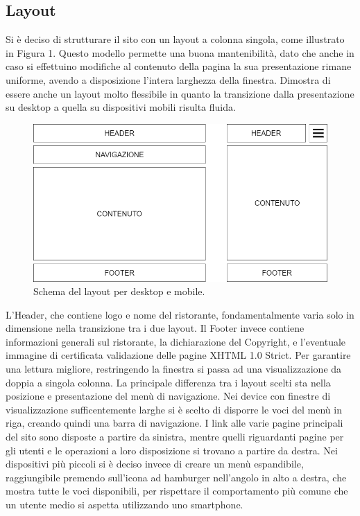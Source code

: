 \documentclass{article}
\begin{document}
		\subsection{Layout}
			Si è deciso di strutturare il sito con un layout a colonna singola, come illustrato in Figura 1. Questo modello permette una buona mantenibilità, dato che anche in caso si effettuino modifiche al contenuto della pagina la sua presentazione rimane uniforme, avendo a disposizione l'intera larghezza della finestra. 
		    Dimostra di essere anche un layout molto flessibile in quanto la transizione dalla presentazione su desktop a quella su dispositivi mobili risulta fluida.
		    \begin{figure}[http] %
		        \centering
		        \includegraphics[width=\textwidth]{schema_layout.png}
		        \caption{Schema del layout per desktop e mobile.}
		        \label{fig:layout}
		    \end{figure}
		    \bigbreak
		    L'Header, che contiene logo e nome del ristorante, fondamentalmente varia solo in dimensione nella transizione tra i due layout.
		    \bigbreak
		    Il Footer invece contiene informazioni generali sul ristorante, la dichiarazione del Copyright, e l'eventuale immagine di certificata validazione delle pagine XHTML 1.0 Strict. Per garantire una lettura migliore, restringendo la finestra si passa ad una visualizzazione da doppia a singola colonna.
		    \bigbreak
		    La principale differenza tra i layout scelti sta nella posizione e presentazione del menù di navigazione. 
		    \newline Nei device con finestre di visualizzazione sufficentemente larghe si è scelto di disporre le voci del menù in riga, creando quindi una barra di navigazione. I link alle varie pagine principali del sito sono disposte a partire da sinistra, mentre quelli riguardanti pagine per gli utenti e le operazioni a loro disposizione si trovano a partire da destra.
		    \newline Nei dispositivi più piccoli si è deciso invece di creare un menù espandibile, raggiungibile premendo sull'icona ad hamburger nell'angolo in alto a destra, che mostra tutte le voci disponibili, per rispettare il comportamento più comune che un utente medio si aspetta utilizzando uno smartphone.
\end{document}
